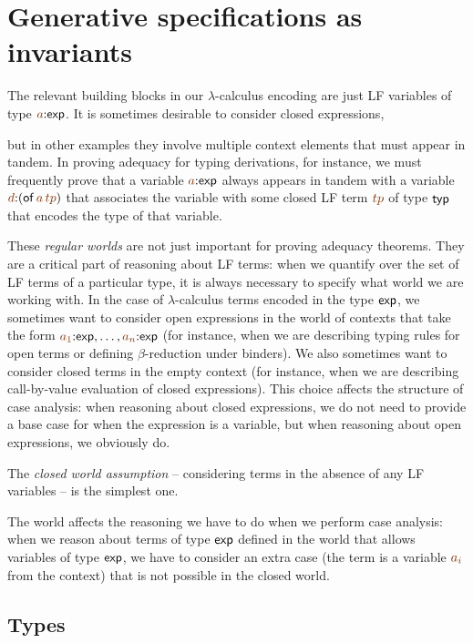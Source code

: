 \chapter{Generative specifications as invariants}
\label{chapter-gen}

The relevant building blocks in our $\lambda$-calculus encoding are
just LF variables of type $\lf{a}{:}{\sf exp}$. It is sometimes
desirable to consider closed expressions, 



but in other examples they
involve multiple context elements that must appear in tandem. In
proving adequacy for typing derivations, for instance, we must
frequently prove that a variable $\lf{a}{:}{\sf exp}$ always appears
in tandem with a variable $\lf{d}{:}({\sf of}\,\lf{a}\,\lf{tp})$ that
associates the variable with some closed LF term $\lf{tp}$ of type
${\sf typ}$ that encodes the type of that variable.

These {\it regular worlds} are not just important for proving adequacy
theorems. They are a critical part of reasoning about LF terms: when
we quantify over the set of LF terms of a particular type, it is
always necessary to specify what world we are working with. In the
case of $\lambda$-calculus terms encoded in the type ${\sf exp}$, we
sometimes want to consider open expressions in the world of contexts
that take the form $\lf{a_1}{:}{\sf exp},\ldots,\lf{a_n}{:}{\sf exp}$
(for instance, when we are describing typing rules for open terms or
defining $\beta$-reduction under binders). We also sometimes want to
consider closed terms in the empty context (for instance, when we are
describing call-by-value evaluation of closed expressions).  This
choice affects the structure of case analysis: when reasoning
about closed expressions, we do not need to provide a base case for
when the expression is a variable, but when reasoning about open
expressions, we obviously do.

The {\it closed world assumption} -- considering terms in the absence
of any LF variables -- is the simplest one. 


The world affects the reasoning we have to do when we perform case
analysis: when we reason about terms of type ${\sf exp}$ defined in
the world that allows variables of type ${\sf exp}$, we have to
consider an extra case (the term is a variable $\lf{a_i}$ from the
context) that is not possible in the closed world. 

\section{Types}

